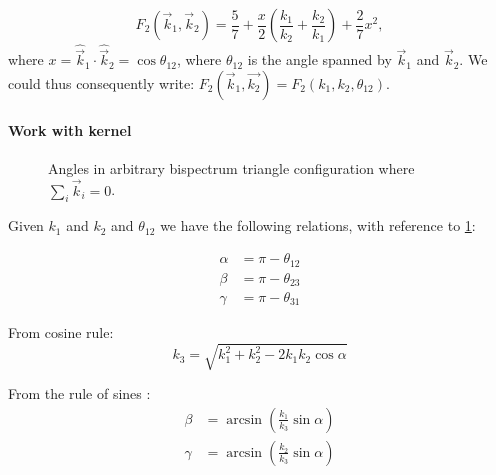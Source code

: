        \begin{equation}
            F_2(\vec{k}_1,\vec{k}_2) = \frac{5}{7} + \frac{x}{2}\left(\frac{k_1}{k_2}+\frac{k_2}{k_1}\right) + \frac{2}{7}x^2,
        \end{equation}
        where $x = \hat{\vec{k}}_1 \cdot \hat{\vec{k}}_2 = \cos{\theta_{12}}$, where $\theta_{12}$ is the angle spanned by $\vec{k}_1$ and $\vec{k}_2$. We could thus consequently write: $F_2(\vec{k}_1,\vec{k_2}) = F_2(k_1,k_2,\theta_{12})$.

        \paragraph{Work with kernel}
        \begin{figure}
            \centering
            
            \caption{Angles in arbitrary bispectrum triangle configuration where $\sum_i \vec{k}_i=0$.}
            \label{fig:data:verification:bispectrum_angles}
          \end{figure}
        Given $k_1$ and $k_2$ and $\theta_{12}$ we have the following relations, with reference to \cref{fig:data:verification:bispectrum_angles}:

        \begin{equation}
            \begin{split}
            \alpha &= \pi-\theta_{12}\\
            \beta &= \pi-\theta_{23}\\
            \gamma &= \pi-\theta_{31}
            \end{split}
        \end{equation} 

        From cosine rule:
        \begin{equation}
            k_3 = \sqrt{k_1^2 + k_2^2 - 2k_1k_2\cos\alpha}
        \end{equation}

        From the rule of sines :
        \begin{equation}
            \begin{split}
            \beta &= \arcsin\left(\frac{k_1}{k_3}\sin\alpha\right)\\
            \gamma &= \arcsin\left(\frac{k_2}{k_3}\sin\alpha\right)
            \end{split}
        \end{equation}

